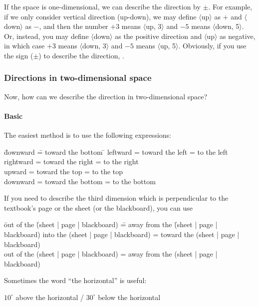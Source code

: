 \documentclass[11pt,pdfa,lastpage]{MishoNote}
\begin{document}
\def\UDL#1{$\langle$\textsf{#1}$\rangle$}

If the space is one-dimensional, we can describe the direction by $\pm$. For example, if we only consider vertical direction (up-down), we may define \UDL{up} as $+$ and \UDL{down} as $-$, and then the number $+3$ means \UDL{up, 3} and $-5$ means \UDL{down, 5}.
Or, instead, you may define \UDL{down} as the positive direction and \UDL{up} as negative, in which case $+3$ means \UDL{down, 3} and $-5$ means \UDL{up, 5}. Obviously, if you use the sign ($\pm$) to describe the direction, .


\newpage

\subsubsection{Directions in two-dimensional space}
Now, how can we describe the direction in two-dimensional space?

\paragraph{Basic}
The easiest method is to use the following expressions:
\begin{tabbing}
 \fakebullet \= downward   \== toward the bottom      \=\kill
 \fakebullet \> leftward   \>= toward the left        \>= to the left\\[\itemsep]
 \fakebullet \> rightward  \>= toward the right       \>= to the right\\[\itemsep]
 \fakebullet \> upward     \>= toward the top         \>= to the top\\[\itemsep]
 \fakebullet \> downward   \>= toward the bottom      \>= to the bottom
\end{tabbing}
If you need to describe the third dimension which is perpendicular to the textbook's page or the sheet (or the blackboard), you can use
\begin{tabbing}
  \fakebullet \= out of the \= (sheet | page | blackboard) \= = away from the \= (sheet | page | blackboard)\kill
  \fakebullet \> into   the \> (sheet | page | blackboard) \> = toward    the \> (sheet | page | blackboard)\\[\itemsep]
  \fakebullet \> out of the \> (sheet | page | blackboard) \> = away from the \> (sheet | page | blackboard)
\end{tabbing}
Sometimes the word ``the horizontal'' is useful:
\begin{miniitemize}
  \item $10^\circ$ above the horizontal / $30^\circ$ below the horizontal
\end{miniitemize}
\end{document}
